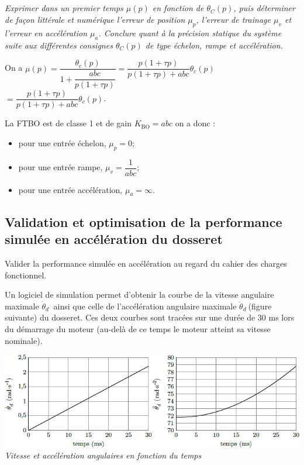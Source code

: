 \documentclass[10pt,fleqn]{article} %
\begin{document}
\begin{multicols}{2}
\subparagraph{}\textit{ Exprimer dans un premier temps $\mu(p)$ en fonction de
  $\theta_C(p)$, puis déterminer de façon littérale et numérique
  l'erreur de position $\mu_p$, l'erreur de trainage
  $\mu_v$ et l'erreur en accélération $\mu_a$.
  Conclure quant à la précision statique du système suite aux
  différentes consignes $\theta_C(p)$ de type échelon, rampe et
  accélération.}

\ifprof
\begin{corrige}
On a $\mu(p)=\dfrac{\theta_c(p)}{1+\dfrac{abc}{p\left( 1+\tau p\right)}}=\dfrac{p\left( 1+\tau p\right)}{p\left( 1+\tau p\right)+abc}\theta_c(p)$ $=\dfrac{p\left( 1+\tau p\right)}{p\left( 1+\tau p\right)+abc}\theta_c(p)$.

La FTBO est de classe 1 et de gain $K_{\text{BO}}={abc}$ on a donc : 
\begin{itemize}
\item pour une entrée échelon, $\mu_p = 0$;
\item pour une entrée rampe, $\mu_v = \dfrac{1}{abc}$;
\item pour une entrée accélération, $\mu_a = \infty$.
\end{itemize}
\end{corrige}
\else
\fi

\subsection*{Validation et optimisation de la performance simulée en
accélération du dosseret}

\begin{obj}
Valider la performance simulée en accélération au regard du cahier des
charges fonctionnel.
\end{obj}

Un logiciel de simulation permet d'obtenir la courbe de la vitesse angulaire maximale \({\dot{\theta}}_{d}\ \) ainsi que celle de l'accélération angulaire maximale
\({\ddot{\theta}}_{d}\ \)(figure suivante) du dosseret. Ces deux courbes sont tracées sur une durée de 30 ms lors du démarrage du moteur (au-delà de  ce temps le moteur atteint sa vitesse nominale).

\begin{center}
\includegraphics[width=1.0\linewidth]{images/image16.png}
\textit{Vitesse et accélération angulaires en fonction du
temps \label{fig15}}
\end{center}



\end{multicols}
\end{document}
